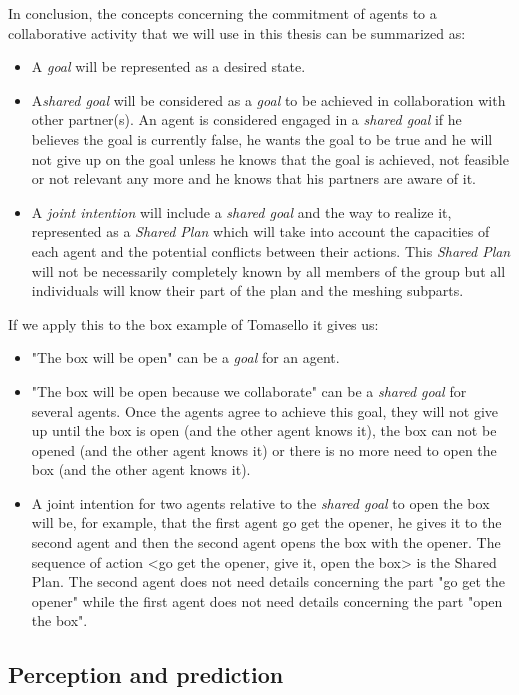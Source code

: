 \documentclass[english,a4paper,11pt,twoside]{StyleThese}
\begin{document}
In conclusion, the concepts concerning the commitment of agents to a collaborative activity that we will use in this thesis can be summarized as:
\begin{itemize}
\item A \textit{goal} will be represented as a desired state.
\item A\textit{shared goal} will be considered as a \textit{goal} to be achieved in collaboration with other partner(s). An agent is considered engaged in a \textit{shared goal} if he believes the goal is currently false, he wants the goal to be true and he will not give up on the goal unless he knows that the goal is achieved, not feasible or not relevant any more and he knows that his partners are aware of it.
\item A \textit{joint intention} will include a \textit{shared goal} and the way to realize it, represented as a \textit{Shared Plan} which will take into account the capacities of each agent and the potential conflicts between their actions. This \textit{Shared Plan} will not be necessarily completely known by all members of the group but all individuals will know their part of the plan and the meshing subparts.
\end{itemize}

If we apply this to the box example of Tomasello it gives us:
\begin{itemize}
\item "The box will be open" can be a \textit{goal} for an agent.
\item "The box will be open because we collaborate" can be a \textit{shared goal} for several agents. Once the agents agree to achieve this goal, they will not give up until the box is open (and the other agent knows it), the box can not be opened (and the other agent knows it) or there is no more need to open the box (and the other agent knows it).
\item A joint intention for two agents relative to the \textit{shared goal} to open the box will be, for example, that the first agent go get the opener, he gives it to the second agent and then the second agent opens the box with the opener. The sequence of action <go get the opener, give it, open the box> is the Shared Plan. The second agent does not need details concerning the part "go get the opener" while the first agent does not need details concerning the part "open the box".
\end{itemize}

\subsection{Perception and prediction}
\end{document}
